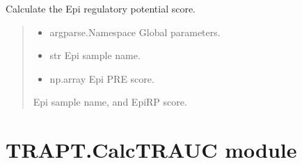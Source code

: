 \documentclass[letterpaper,10pt,english]{sphinxmanual}
\begin{document}
\begin{fulllineitems}
\label{\detokenize{index:TRAPT.CalcSampleRPMatrix.dhs2gene}}
\pysigstartsignatures
{}
\pysigstopsignatures
\sphinxAtStartPar
Calculate the Epi regulatory potential score.
\begin{quote}\begin{description}
\begin{itemize}
\item {} 
\sphinxAtStartPar
{} \textendash{} argparse.Namespace
Global parameters.

\item {} 
\sphinxAtStartPar
{} \textendash{} str
Epi sample name.

\item {} 
\sphinxAtStartPar
{} \textendash{} np.array
Epi PRE score.

\end{itemize}

\sphinxAtStartPar
Epi sample name, and Epi\sphinxhyphen{}RP score.

\end{description}\end{quote}

\end{fulllineitems}



\chapter{TRAPT.CalcTRAUC module}
\label{\detokenize{index:module-TRAPT.CalcTRAUC}}\label{\detokenize{index:trapt-calctrauc-module}}
\end{document}
